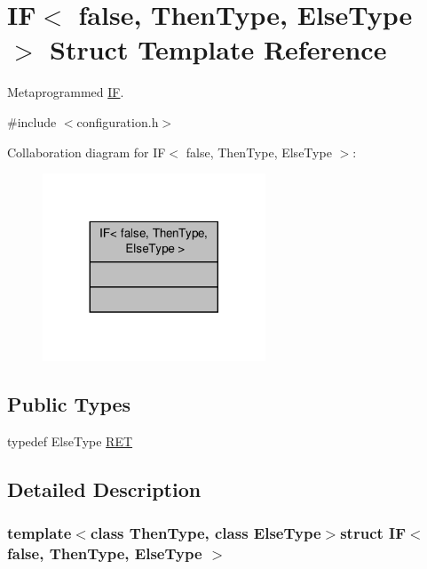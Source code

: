 \hypertarget{structIF_3_01false_00_01ThenType_00_01ElseType_01_4}{\section{I\-F$<$ false, Then\-Type, Else\-Type $>$ Struct Template Reference}
\label{structIF_3_01false_00_01ThenType_00_01ElseType_01_4}
}


Metaprogrammed \hyperlink{structIF}{I\-F}.  




{\ttfamily \#include $<$configuration.\-h$>$}



Collaboration diagram for I\-F$<$ false, Then\-Type, Else\-Type $>$\-:\nopagebreak
\begin{figure}[H]
\begin{center}
\leavevmode
\includegraphics[width=188pt]{structIF_3_01false_00_01ThenType_00_01ElseType_01_4__coll__graph}
\end{center}
\end{figure}
\subsection*{Public Types}
\begin{DoxyCompactItemize}
\item 
typedef Else\-Type \hyperlink{structIF_3_01false_00_01ThenType_00_01ElseType_01_4_aa7d9ee5d71d3235a17de49470e2a00a0}{R\-E\-T}
\end{DoxyCompactItemize}


\subsection{Detailed Description}
\subsubsection*{template$<$class Then\-Type, class Else\-Type$>$struct I\-F$<$ false, Then\-Type, Else\-Type $>$}

